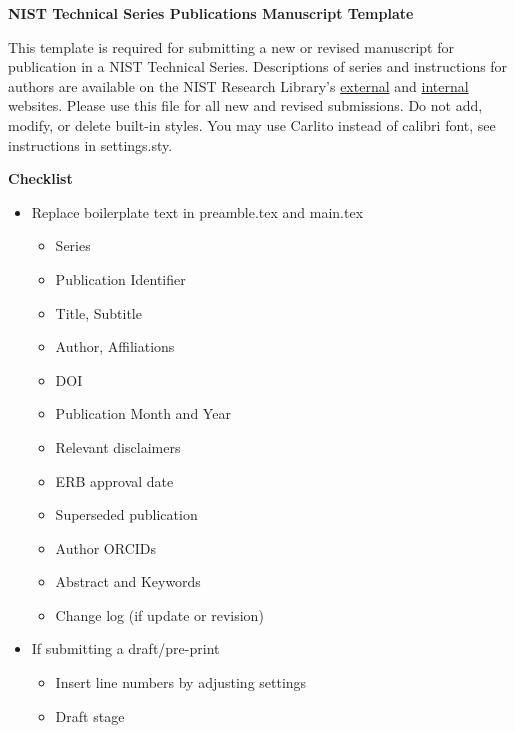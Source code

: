 \begin{titlepage}

\textbf{NIST Technical Series Publications Manuscript Template}

This template is required for submitting a new or revised manuscript for publication in a NIST Technical Series. Descriptions of series and instructions for authors are available 
on the NIST Research Library’s \href{https://www.nist.gov/nist-research-library/nist-publications}{external} and \href{https://inet.nist.gov/library/publishing-support-nist-publications/nist-technical-series-publications}{internal} websites.
Please use this file for all new and revised submissions. 
Do not add, modify, or delete built-in styles. You may use Carlito instead of calibri font, see instructions in settings.sty.

\textbf{Checklist}
  \begin{multicols}{2}
   \begin{itemize}[nospace]
   \item Replace boilerplate text in preamble.tex and main.tex
 \begin{itemize}[nospace]
     \item[\ding{114}] Series
     \item[\ding{114}] Publication Identifier
     \item[\ding{114}] Title, Subtitle
     \item[\ding{114}] Author, Affiliations
    \item[\ding{114}] DOI
    \item[\ding{114}] Publication Month and Year 
    \item[\ding{114}] Relevant disclaimers
    \item[\ding{114}] ERB approval date
    \item[\ding{114}] Superseded publication 
    \item[\ding{114}] Author ORCIDs
    \item[\ding{114}] Abstract and Keywords
    \item[\ding{114}] Change log (if update or revision)
\end{itemize}
\end{itemize}
\begin{itemize}[nospace]
   \item If submitting a draft/pre-print
\begin{itemize}[nospace]
\item[\ding{114}] Insert line numbers by adjusting settings
\item[\ding{114}] Draft stage

\end{itemize}
\end{itemize}
\end{multicols}
\end{titlepage}
